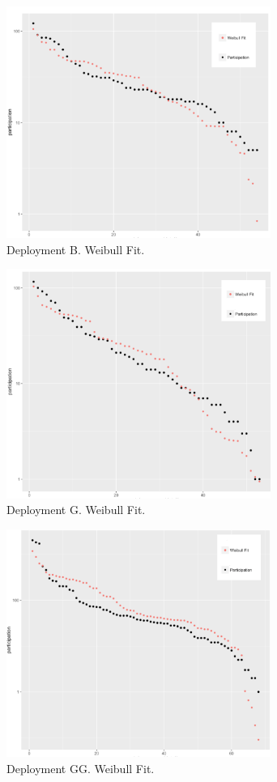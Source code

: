 %
\begin{figure}[!t]
    \centering
        \includegraphics[width=3.4in]{img/weibull_1.png}
    \caption{Deployment B. Weibull Fit.}
    \label{fig:w1}
\end{figure}
%
\begin{figure}[!t]
    \centering
        \includegraphics[width=3.4in]{img/weibull_2.png}
    \caption{Deployment G. Weibull Fit.}
    \label{fig:w2}
\end{figure}

\begin{figure}[!t]
    \centering
        \includegraphics[width=3.4in]{img/weibull_3.png}
    \caption{Deployment GG. Weibull Fit.}
    \label{fig:w3}
\end{figure}





